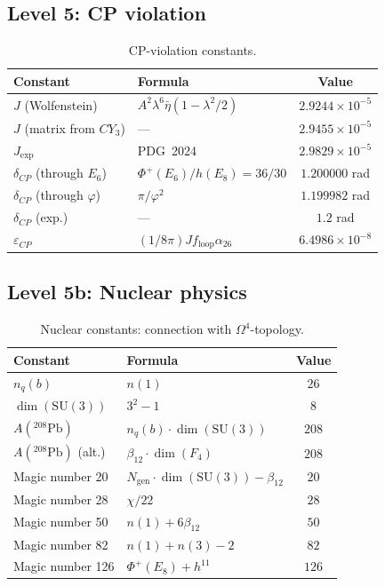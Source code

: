 \documentclass[11pt,a4paper]{article}
\newcommand{\SU}{\ensuremath{\mathrm{SU}}}
\newcommand{\CY}{\ensuremath{CY_3}}
\newcommand{\Om}{\ensuremath{\Omega^4}}
\newcommand{\Ngen}{\ensuremath{N_{\text{gen}}}}
\theoremstyle{definition}
\begin{document}
\subsection{Level 5: CP violation}
\label{app:level-5-cp}

\begin{table}[ht]
\centering
\caption{CP-violation constants.}
\label{tab:app-cp}
\begin{tabular}{llc}
\toprule
Constant & Formula & Value \\
\midrule
$J$ (Wolfenstein) & $A^2 \lambda^6 \bar{\eta} (1 - \lambda^2/2)$ & $2.9244 \times 10^{-5}$ \\
$J$ (matrix from $\CY$) & — & $2.9455 \times 10^{-5}$ \\
$J_{\text{exp}}$ & PDG~2024 & $2.9829 \times 10^{-5}$ \\
$\delta_{CP}$ (through $E_6$) & $\Phi^+(E_6)/h(E_8) = 36/30$ & $1.200000$ rad \\
$\delta_{CP}$ (through $\varphi$) & $\pi/\varphi^2$ & $1.199982$ rad \\
$\delta_{CP}$ (exp.) & — & $1.2$ rad \\
$\varepsilon_{CP}$ & $(1/8\pi) J f_{\text{loop}} \alpha_{26}$ & $6.4986 \times 10^{-8}$ \\
\bottomrule
\end{tabular}
\end{table}

\subsection{Level 5b: Nuclear physics}
\label{app:level-5b-nuclear}

\begin{table}[ht]
\centering
\caption{Nuclear constants: connection with $\Om$-topology.}
\label{tab:app-nuclear}
\begin{tabular}{llc}
\toprule
Constant & Formula & Value \\
\midrule
$n_q(b)$ & $n(1)$ & $26$ \\
$\dim(\SU(3))$ & $3^2 - 1$ & $8$ \\
$A(^{208}\text{Pb})$ & $n_q(b) \cdot \dim(\SU(3))$ & $208$ \\
$A(^{208}\text{Pb})$ (alt.) & $\beta_{12} \cdot \dim(F_4)$ & $208$ \\
\midrule
Magic number 20  & $\Ngen \cdot \dim(\SU(3)) - \beta_{12}$ & $20$ \\
Magic number 28  & $\chi/22$ & $28$ \\
Magic number 50  & $n(1) + 6\beta_{12}$ & $50$ \\
Magic number 82  & $n(1) + n(3) - 2$ & $82$ \\
Magic number 126 & $\Phi^+(E_8) + h^{11}$ & $126$ \\
\bottomrule
\end{tabular}
\end{table}
\end{document}
